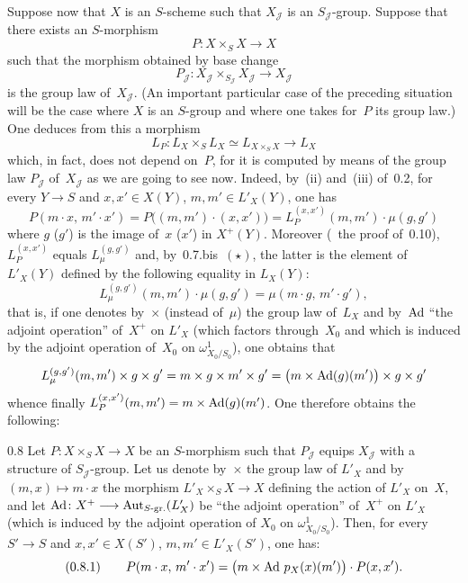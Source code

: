 %
{\renewcommand{\thefootnote}{(27)}}
Suppose now that \(X\) is an \(S\)-scheme such that \(X_{\mathcal{J}}\) is an
\(S_{\mathcal{J}}\)-group. Suppose that there exists an \(S\)-morphism
\[
P\colon X\times_{S}X \to X
\]
such that the morphism obtained by base change
\[
P_{\mathcal{J}}\colon
  X_{\mathcal{J}}\times_{S_{\mathcal{J}}}X_{\mathcal{J}}
  \to X_{\mathcal{J}}
\]
is the group law of~\(X_{\mathcal{J}}\). (An important particular case of the
preceding situation will be the case where \(X\) is an \(S\)-group and where
one takes for~\(P\) its group law.) One deduces from this a morphism
\[
L_{P}\colon
  L_{X}\times_{S}L_{X}
  \simeq
  L_{X\times_{S}X}
  \to
  L_{X}
\]
which, in fact, does not depend on~\(P\), for it is computed by means of the
group law \(P_{\mathcal{J}}\) of~\(X_{\mathcal{J}}\) as we are going to see
now.%
{\renewcommand{\thefootnote}{(28)}}
Indeed, by~(ii) and~(iii) of~0.2, for every \(Y\to S\) and
\(x,x'\in X(Y)\), \(m,m'\in L'_{X}(Y)\), one has
\[
P(m\cdot x,\,m'\cdot x')
=
P\bigl((m,m')\cdot(x,x')\bigr)
=
L_{P}^{(x,x')}(m,m')\cdot\mu(g,g')
\]
where \(g\) (\resp \(g'\)) is the image of~\(x\) (\resp \(x'\)) in
\(X^{+}(Y)\). Moreover (\cf\ the proof of~0.10), \(L_{P}^{(x,x')}\) equals
\(L_{\mu}^{(g,g')}\) and, by~0.7.bis~\((\star)\), the latter is the element
of \(L'_{X}(Y)\) defined by the following equality in \(L_{X}(Y)\):
\[
L_{\mu}^{(g,g')}(m,m')\cdot\mu(g,g')
=
\mu(m\cdot g,\,m'\cdot g'),
\]
that is, if one denotes by~\(\times\) (instead of~\(\mu\)) the group law
of~\(L_{X}\) and by~\(\operatorname{Ad}\) ``the adjoint operation'' of~\(X^{+}\) on
\(L'_{X}\) (which factors through~\(X_{0}\) and which is induced by the
adjoint operation of~\(X_{0}\) on \(\omega^{1}_{X_{0}/S_{0}}\)), one obtains
that
\[
L_{\mu}^{(g,g')}(m,m')\times g\times g'
=
m\times g\times m'\times g'
=
\bigl(m\times\operatorname{Ad}(g)(m')\bigr)\times g\times g'
\]
whence finally \(L_{P}^{(x,x')}(m,m')=m\times\operatorname{Ad}(g)(m')\). One therefore
obtains the following:

\begin{proposition}{0.8}
\label{III.0.8}
Let \(P\colon X\times_{S}X\to X\) be an \(S\)-morphism such that
\(P_{\mathcal{J}}\) equips \(X_{\mathcal{J}}\) with a structure of
\(S_{\mathcal{J}}\)-group. Let us denote by~\(\times\) the group law of
\(L'_{X}\) and by \((m,x)\mapsto m\cdot x\) the morphism
\(L'_{X}\times_{S}X\to X\) defining the action of \(L'_{X}\) on~\(X\), and let
\(\operatorname{Ad}\colon X^{+}\longrightarrow\operatorname{Aut}_{S\text{-gr.}}(L'_{X})\) be ``the adjoint operation''
of~\(X^{+}\) on \(L'_{X}\) (which is induced by the adjoint operation of
\(X_{0}\) on \(\omega^{1}_{X_{0}/S_{0}}\)). Then, for every \(S'\to S\) and
\(x,x'\in X(S')\), \(m,m'\in L'_{X}(S')\), one has:
\begin{equation*}
(0.8.1)\qquad
P(m\cdot x,\,m'\cdot x')
=
\bigl(m\times\operatorname{Ad}\,p_{X}(x)(m')\bigr)\cdot P(x,x').
\end{equation*}
\end{proposition}

